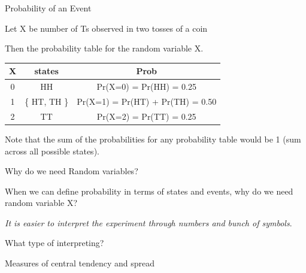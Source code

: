 \documentclass{beamer}\usepackage[]{graphicx}\usepackage[]{color}
\begin{document}
\begin{frame}[fragile]{Probability  of an Event \;\;}

Let X be number of Ts observed in two tosses of a coin \pause \newline

Then the probability table for the random variable X. \newline

\begin{tabular}{|c|c|c|}
\hline
X & states & Prob \\ \hline
0 & HH & Pr(X=0) = Pr(HH) = 0.25 \\ \hline
1 & \{ HT, TH \} & Pr(X=1) = Pr(HT) + Pr(TH) = 0.50 \\ \hline
2 & TT & Pr(X=2) = Pr(TT) = 0.25 \\ \hline
\end{tabular} \newline \newline

Note that the sum of the probabilities for any probability table would be 1 (sum across all possible states).

\end{frame}

\begin{frame}[fragile]{Why do we need Random variables? \;\;}

When we can define probability in terms of states and events, why do we need random variable X? \pause \newline

\emph{It is easier to interpret the experiment through numbers and bunch of symbols}.

What type of interpreting? \pause \newline

Measures of central tendency and spread

\end{frame}
\end{document}
